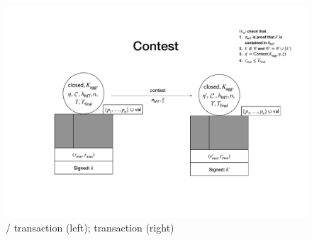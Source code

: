 \begin{figure}

  \centering


  \includegraphics[width=\textwidth/2]{figures/SM_closed_closed.pdf}

  \caption{\mtxClose{}/\mtxContest{} transaction (left);
    \mtxContest{} transaction (right)}
  \label{fig:SM_closed_closed}

\end{figure}



